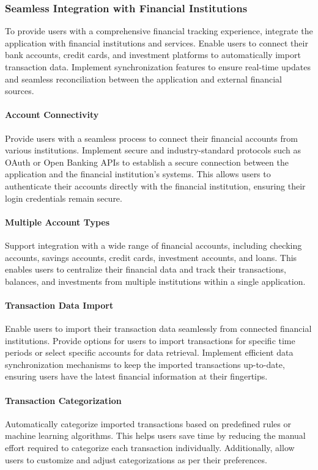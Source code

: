 \subsubsection{Seamless Integration with Financial Institutions}
To provide users with a comprehensive financial tracking experience, integrate the application with financial 
institutions and services. Enable users to connect their bank accounts, credit cards, and investment platforms 
to automatically import transaction data. Implement synchronization features to ensure real-time updates and 
seamless reconciliation between the application and external financial sources.

\paragraph{Account Connectivity}
Provide users with a seamless process to connect their financial accounts from various institutions. 
Implement secure and industry-standard protocols such as OAuth or Open Banking APIs to establish a secure connection 
between the application and the financial institution's systems. This allows users to authenticate their accounts 
directly with the financial institution, ensuring their login credentials remain secure.

\paragraph{Multiple Account Types}
Support integration with a wide range of financial accounts, including checking accounts, 
savings accounts, credit cards, investment accounts, and loans. This enables users to centralize their financial 
data and track their transactions, balances, and investments from multiple institutions within a single application.

\paragraph{Transaction Data Import}
Enable users to import their transaction data seamlessly from connected financial institutions. 
Provide options for users to import transactions for specific time periods or select specific accounts for data 
retrieval. Implement efficient data synchronization mechanisms to keep the imported transactions up-to-date, 
ensuring users have the latest financial information at their fingertips.

\paragraph{Transaction Categorization}
Automatically categorize imported transactions based on predefined rules or machine 
learning algorithms. This helps users save time by reducing the manual effort required to categorize each transaction
individually. Additionally, allow users to customize and adjust categorizations as per their preferences.

